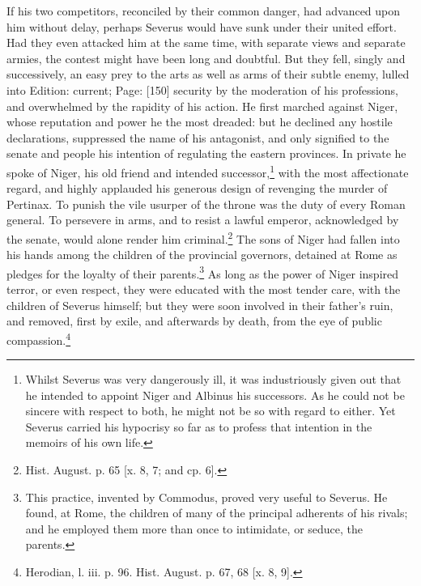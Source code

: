 If his two competitors, reconciled by their common danger, had advanced upon him without delay, perhaps Severus would have sunk under their united effort. Had they even attacked him at the same time, with separate views and separate armies, the contest might have been long and doubtful. But they fell, singly and successively, an easy prey to the arts as well as arms of their subtle enemy, lulled into Edition: current; Page: [150] security by the moderation of his professions, and overwhelmed by the rapidity of his action. He first marched against Niger, whose reputation and power he the most dreaded: but he declined any hostile declarations, suppressed the name of his antagonist, and only signified to the senate and people his intention of regulating the eastern provinces. In private he spoke of Niger, his old friend and intended successor,\footnote{Whilst Severus was very dangerously ill, it was industriously given out that he intended to appoint Niger and Albinus his successors. As he could not be sincere with respect to both, he might not be so with regard to either. Yet Severus carried his hypocrisy so far as to profess that intention in the memoirs of his own life.} with the most affectionate regard, and highly applauded his generous design of revenging the murder of Pertinax. To punish the vile usurper of the throne was the duty of every Roman general. To persevere in arms, and to resist a lawful emperor, acknowledged by the senate, would alone render him criminal.\footnote{Hist. August. p. 65 [x. 8, 7; and cp. 6].} The sons of Niger had fallen into his hands among the children of the provincial governors, detained at Rome as pledges for the loyalty of their parents.\footnote{This practice, invented by Commodus, proved very useful to Severus. He found, at Rome, the children of many of the principal adherents of his rivals; and he employed them more than once to intimidate, or seduce, the parents.} As long as the power of Niger inspired terror, or even respect, they were educated with the most tender care, with the children of Severus himself; but they were soon involved in their father\texthebrew{}’s ruin, and removed, first by exile, and afterwards by death, from the eye of public compassion.\footnote{Herodian, l. iii. p. 96. Hist. August. p. 67, 68 [x. 8, 9].}


